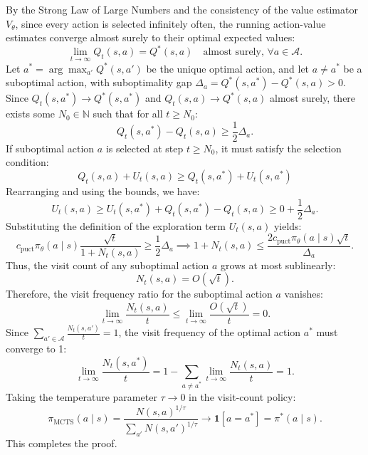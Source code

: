 \documentclass{article}
\begin{document}
By the Strong Law of Large Numbers and the consistency of the value estimator $V_\theta$, since every action is selected infinitely often, the running action-value estimates converge almost surely to their optimal expected values:
\begin{equation}
    \lim_{t \to \infty} Q_t(s, a) = Q^*(s, a) \quad \text{almost surely, } \forall a \in \mathcal{A}.
\end{equation}
Let $a^* = \arg\max_{a'} Q^*(s, a')$ be the unique optimal action, and let $a \neq a^*$ be a suboptimal action, with suboptimality gap $\Delta_a = Q^*(s, a^*) - Q^*(s, a) > 0$.
Since $Q_t(s, a^*) \to Q^*(s, a^*)$ and $Q_t(s, a) \to Q^*(s, a)$ almost surely, there exists some $N_0 \in \mathbb{N}$ such that for all $t \geq N_0$:
\begin{equation}
    Q_t(s, a^*) - Q_t(s, a) \geq \frac{1}{2} \Delta_a.
\end{equation}
If suboptimal action $a$ is selected at step $t \geq N_0$, it must satisfy the selection condition:
\begin{equation}
    Q_t(s, a) + U_t(s, a) \geq Q_t(s, a^*) + U_t(s, a^*)
\end{equation}
Rearranging and using the bounds, we have:
\begin{equation}
    U_t(s, a) \geq U_t(s, a^*) + Q_t(s, a^*) - Q_t(s, a) \geq 0 + \frac{1}{2} \Delta_a.
\end{equation}
Substituting the definition of the exploration term $U_t(s, a)$ yields:
\begin{equation}
    c_{\mathrm{puct}} \pi_\theta(a \mid s) \frac{\sqrt{t}}{1 + N_t(s, a)} \geq \frac{1}{2} \Delta_a \implies 1 + N_t(s, a) \leq \frac{2 c_{\mathrm{puct}} \pi_\theta(a \mid s) \sqrt{t}}{\Delta_a}.
\end{equation}
Thus, the visit count of any suboptimal action $a$ grows at most sublinearly:
\begin{equation}
    N_t(s, a) = O(\sqrt{t}).
\end{equation}
Therefore, the visit frequency ratio for the suboptimal action $a$ vanishes:
\begin{equation}
    \lim_{t \to \infty} \frac{N_t(s, a)}{t} \leq \lim_{t \to \infty} \frac{O(\sqrt{t})}{t} = 0.
\end{equation}
Since $\sum_{a' \in \mathcal{A}} \frac{N_t(s, a')}{t} = 1$, the visit frequency of the optimal action $a^*$ must converge to 1:
\begin{equation}
    \lim_{t \to \infty} \frac{N_t(s, a^*)}{t} = 1 - \sum_{a \neq a^*} \lim_{t \to \infty} \frac{N_t(s, a)}{t} = 1.
\end{equation}
Taking the temperature parameter $\tau \to 0$ in the visit-count policy:
\begin{equation}
    \pi_{\mathrm{MCTS}}(a \mid s) = \frac{N(s, a)^{1/\tau}}{\sum_{a'} N(s, a')^{1/\tau}} \to \mathbf{1}[a = a^*] = \pi^*(a \mid s).
\end{equation}
This completes the proof.
\end{document}
